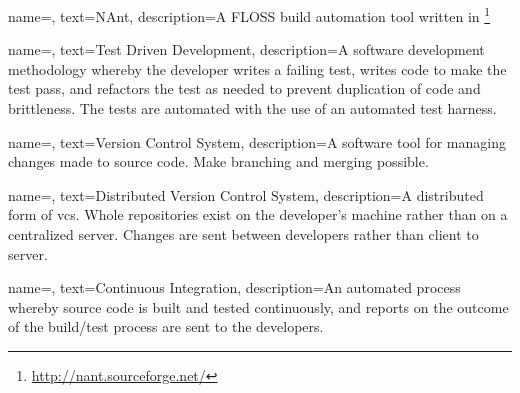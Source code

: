 
{
name=,
text=NAnt,
description={A \gls{FLOSS} build automation tool written in \CSharp\footnote{\url{http://nant.sourceforge.net/}}}
}


{
name=,
text=Test Driven Development,
description={A software development methodology whereby the developer writes a failing test, writes code to make the test pass, and refactors the test as needed to prevent duplication of code and brittleness. The tests are automated with the use of an automated test harness.}
}
	

{
name=,
text=Version Control System,
description={A software tool for managing changes made to source code. Make \gls{branching} and \gls{merging} possible.}
}


{
name=,
text=Distributed Version Control System,
description={A distributed form of \gls{vcs}. Whole repositories exist on the developer's machine rather than on a centralized server. Changes are sent between developers rather than client to server.}
}


{
name=,
text=Continuous Integration,
description={An automated process whereby source code is built and tested continuously, and reports on the outcome of the build/test process are sent to the developers.}
}

